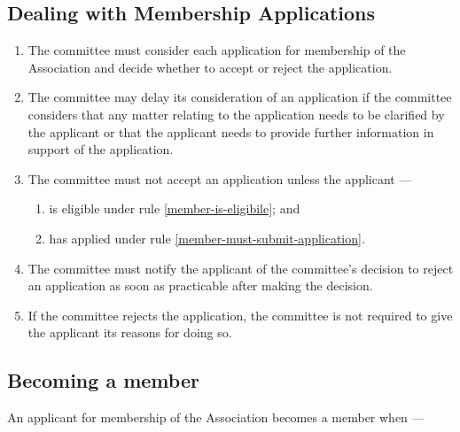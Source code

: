 \documentclass[../constitution.tex]{subfiles}
\begin{document}
\subsection{Dealing with Membership Applications}\label{dealing-with-membership-applications}

\begin{enumerate}
\item The committee must consider each application for membership of the Association and decide whether to accept or reject the application. 
\item The committee may delay its consideration of an application if the committee considers that any matter relating to the application needs to be clarified by the applicant or that the applicant needs to provide further information in support of the application.
\item The committee must not accept an application unless the applicant ---
  \begin{enumerate}
  \item is eligible under rule \ref{member-is-eligibile}; and
  \item has applied under rule \ref{member-must-submit-application}.
  \end{enumerate} 
\item The committee must notify the applicant of the committee's decision to reject an application as soon as practicable after making the decision. 
\item If the committee rejects the application, the committee is not required to give the applicant its reasons for doing so.
\end{enumerate}


\subsection{Becoming a member} \label{becoming-a-member}


An applicant for membership of the Association becomes a member when ---
\end{document}
